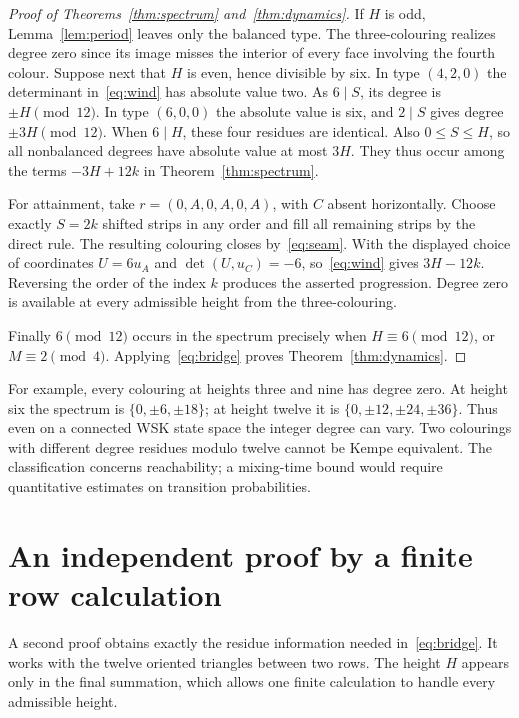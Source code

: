 \documentclass[11pt,a4paper]{article}
\begin{document}
\begin{proof}[Proof of Theorems~\ref{thm:spectrum} and~\ref{thm:dynamics}]
If $H$ is odd, Lemma~\ref{lem:period} leaves only the balanced type. The three-colouring realizes degree zero since its image misses the interior of every face involving the fourth colour. Suppose next that $H$ is even, hence divisible by six. In type $(4,2,0)$ the determinant in~\eqref{eq:wind} has absolute value two. As $6\mid S$, its degree is $\pm H\pmod{12}$. In type $(6,0,0)$ the absolute value is six, and $2\mid S$ gives degree $\pm 3H\pmod{12}$. When $6\mid H$, these four residues are identical. Also $0\le S\le H$, so all nonbalanced degrees have absolute value at most $3H$. They thus occur among the terms $-3H+12k$ in Theorem~\ref{thm:spectrum}.

For attainment, take $r=(0,A,0,A,0,A)$, with $C$ absent horizontally. Choose exactly $S=2k$ shifted strips in any order and fill all remaining strips by the direct rule. The resulting colouring closes by~\eqref{eq:seam}. With the displayed choice of coordinates $U=6u_A$ and $\det(U,u_C)=-6$, so~\eqref{eq:wind} gives $3H-12k$. Reversing the order of the index $k$ produces the asserted progression. Degree zero is available at every admissible height from the three-colouring.

Finally $6\pmod{12}$ occurs in the spectrum precisely when $H\equiv6\pmod{12}$, or $M\equiv2\pmod4$. Applying~\eqref{eq:bridge} proves Theorem~\ref{thm:dynamics}.
\end{proof}

For example, every colouring at heights three and nine has degree zero. At height six the spectrum is $\{0,\pm6,\pm18\}$; at height twelve it is $\{0,\pm12,\pm24,\pm36\}$. Thus even on a connected WSK state space the integer degree can vary. Two colourings with different degree residues modulo twelve cannot be Kempe equivalent. The classification concerns reachability; a mixing-time bound would require quantitative estimates on transition probabilities.

\section{An independent proof by a finite row calculation}

A second proof obtains exactly the residue information needed in~\eqref{eq:bridge}. It works with the twelve oriented triangles between two rows. The height $H$ appears only in the final summation, which allows one finite calculation to handle every admissible height.
\end{document}
